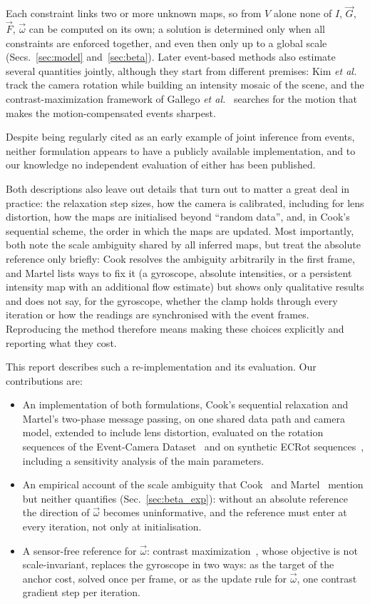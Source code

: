\documentclass[journal]{IEEEtran}
\newcommand{\Imap}{I}
\newcommand{\Vmap}{V}
\newcommand{\Gmap}{\vec{G}}
\newcommand{\Fmap}{\vec{F}}
\newcommand{\wvec}{\vec{\omega}}
\begin{document}
Each constraint links two or more unknown maps, so from $\Vmap$ alone none of
$\Imap$, $\Gmap$, $\Fmap$, $\wvec$ can be computed on its own; a solution is
determined only when all constraints are enforced together, and even then only up
to a global scale (Secs.~\ref{sec:model} and~\ref{sec:beta}).
Later event-based methods also estimate several quantities jointly, although they
start from different premises: Kim \emph{et al.}~\cite{kim2014} track the camera
rotation while building an intensity mosaic of the scene, and the
contrast-maximization framework of Gallego \emph{et al.}~\cite{gallego2018cmax}
searches for the motion that makes the motion-compensated events sharpest.

Despite being regularly cited as an early example of joint inference from events,
neither formulation appears to have a publicly available implementation, and to
our knowledge no independent evaluation of either has been published.

Both descriptions also leave out details that turn out to matter a great deal in
practice: the relaxation step sizes, how the camera is calibrated, including for lens distortion, how
the maps are initialised beyond ``random data'', and, in Cook's sequential
scheme, the order in which the maps are updated. Most importantly, both note the scale ambiguity shared by all inferred maps, but treat the absolute reference only briefly: Cook resolves the ambiguity
arbitrarily in the first frame, and Martel lists ways to fix it (a gyroscope, absolute intensities, or a
persistent intensity map with an additional flow estimate) but shows only
qualitative results and does not say, for the gyroscope, whether the clamp holds
through every iteration or how the readings are synchronised with the event frames. Reproducing the method therefore means making these choices explicitly
and reporting what they cost.

This report describes such a re-implementation and its evaluation. Our
contributions are:
    \begin{itemize}
\item An implementation of both formulations, Cook's sequential relaxation and Martel's two-phase message passing, on one shared
      data path and camera model, extended to include lens distortion, evaluated on the rotation sequences of the
      Event-Camera Dataset~\cite{mueggler2017} and on synthetic ECRot
      sequences~\cite{guo2024cmaxslam}, including a sensitivity analysis of the
      main parameters.
\item An empirical account of the scale ambiguity that Cook~\cite{cook2011} and Martel~\cite{martel2019thesis} mention but
      neither quantifies (Sec.~\ref{sec:beta_exp}): without
      an absolute reference the direction of $\wvec$ becomes uninformative, and
      the reference must enter at every iteration, not only at initialisation.
\item A sensor-free reference for $\wvec$: contrast maximization~\cite{gallego2018cmax},
      whose objective is not scale-invariant, replaces the gyroscope in two ways: as the target of the anchor cost, solved once per frame, or as the update rule for $\wvec$, one contrast gradient step per iteration.
\end{itemize}
\end{document}
